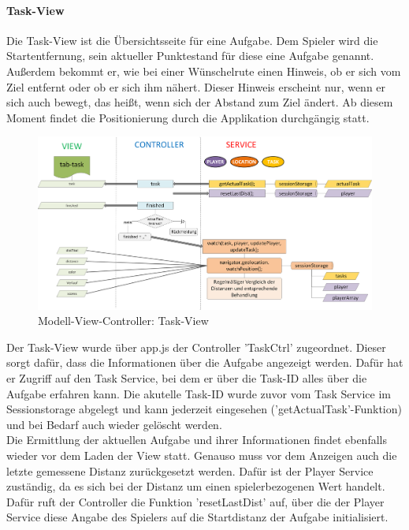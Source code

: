 \paragraph{Task-View}
%
%
Die Task-View ist die Übersichtsseite für eine Aufgabe. Dem Spieler wird die Startentfernung, sein aktueller Punktestand für diese eine Aufgabe genannt. Außerdem bekommt er, wie bei einer Wünschelrute einen Hinweis, ob er sich vom Ziel entfernt oder ob er sich ihm nähert. Dieser Hinweis erscheint nur, wenn er sich auch bewegt, das heißt, wenn sich der Abstand zum Ziel ändert. Ab diesem Moment findet die Positionierung durch die Applikation durchgängig statt.
%
%
\begin{figure}[h]
\centering
\includegraphics[width=1\textwidth]{ref/images/05-task-tab.png}
\caption[Modell-View-Controller: Task-View]{Modell-View-Controller: Task-View}
\label{fig:MVC:Task-View}
\end{figure}
%
%
Der Task-View wurde über app.js der Controller 'TaskCtrl' zugeordnet. Dieser sorgt dafür, dass die Informationen über die Aufgabe angezeigt werden. Dafür hat er Zugriff auf den Task Service, bei dem er über die Task-ID alles über die Aufgabe erfahren kann. Die akutelle Task-ID wurde zuvor vom Task Service im Sessionstorage abgelegt und kann jederzeit eingesehen ('getActualTask'-Funktion) und bei Bedarf auch wieder gelöscht werden.
\\
Die Ermittlung der aktuellen Aufgabe und ihrer Informationen findet ebenfalls wieder vor dem Laden der View statt. Genauso muss vor dem Anzeigen auch die letzte gemessene Distanz zurückgesetzt werden. Dafür ist der Player Service zuständig, da es sich bei der Distanz um einen spielerbezogenen Wert handelt. Dafür ruft der Controller die Funktion 'resetLastDist' auf, über die der Player Service diese Angabe des Spielers auf die Startdistanz der Aufgabe initialisiert.
